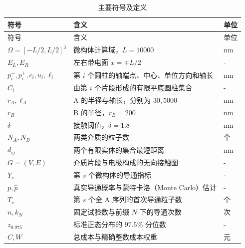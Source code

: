 \begin{longtable}[]{@{}
  >{\raggedright\arraybackslash}p{}
  >{\raggedright\arraybackslash}p{}
  >{\centering\arraybackslash}p{}@{}}
\caption{主要符号及定义}\tabularnewline
\toprule\noalign{}
\begin{minipage}[b]{\linewidth}\raggedright
符号
\end{minipage} & \begin{minipage}[b]{\linewidth}\raggedright
含义
\end{minipage} & \begin{minipage}[b]{\linewidth}\centering
单位
\end{minipage} \\
\midrule\noalign{}
\endfirsthead
\toprule\noalign{}
\begin{minipage}[b]{\linewidth}\raggedright
符号
\end{minipage} & \begin{minipage}[b]{\linewidth}\raggedright
含义
\end{minipage} & \begin{minipage}[b]{\linewidth}\centering
单位
\end{minipage} \\
\midrule\noalign{}
\endhead
\bottomrule\noalign{}
\endlastfoot
\(\Omega=[-L/2,L/2]^3\) & 微构体计算域，\(L=10000\) & \(\mathrm{nm}\) \\
\(E_L,E_R\) & 左右带电面 \(x=\mp L/2\) & - \\
\(p_i^-,p_i^+,c_i,u_i,\ell_i\) & 第 \(i\) 个圆柱的轴端点、中心、单位方向和轴长 & \(\mathrm{nm}\) \\
\(C_i\) & 由第 \(i\) 个片段形成的有限平底圆柱集合 & - \\
\(r_A,\ell_A\) & A 的半径与轴长，分别为 \(30,5000\) & \(\mathrm{nm}\) \\
\(r_B\) & B 的半径，\(r_B=200\) & \(\mathrm{nm}\) \\
\(\delta\) & 接触阈值，\(\delta=1.8\) & \(\mathrm{nm}\) \\
\(N_A,N_B\) & 两类介质的粒子数 & 个 \\
\(d_{ij}\) & 两个有限实体的集合最短距离 & \(\mathrm{nm}\) \\
\(G=(V,E)\) & 介质片段与电极构成的无向接触图 & - \\
\(Y_s\) & 第 \(s\) 个微构体的导通指标 & - \\
\(p,\widehat p\) & 真实导通概率与蒙特卡洛（Monte Carlo）估计 & - \\
\(T_s\) & 第 \(s\) 个全 A 序列的首次导通粒子数 & 个 \\
\(n,k_N\) & 固定试验数与前缀 \(N\) 下的导通次数 & 次 \\
\(z_{0.975}\) & 标准正态分布的 \(97.5\%\) 分位数 & - \\
\(C,W\) & 总成本与精确整数成本权重 & 元 \\
\end{longtable}

